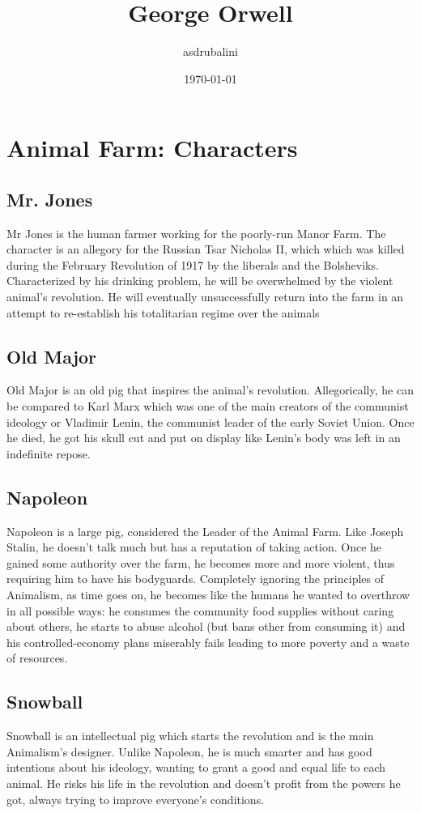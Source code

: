 \documentclass{article}
\title{George Orwell}
\author{asdrubalini}
\date{\today}
\begin{document}
    \maketitle

    \section{Animal Farm: Characters}

    \subsection{Mr. Jones}
    Mr Jones is the human farmer working for the poorly-run Manor Farm. The character is an allegory for the Russian Tsar Nicholas II, which which was killed during the February Revolution of 1917 by the liberals and the Bolsheviks. Characterized by his drinking problem, he will be overwhelmed by the violent animal's revolution. He will eventually unsuccessfully return into the farm in an attempt to re-establish his totalitarian regime over the animals

    \subsection{Old Major}
    Old Major is an old pig that inspires the animal's revolution. Allegorically, he can be compared to Karl Marx which was one of the main creators of the communist ideology or Vladimir Lenin, the communist leader of the early Soviet Union. Once he died, he got his skull cut and put on display like Lenin's body was left in an indefinite repose.

    \subsection{Napoleon}
    Napoleon is a large pig, considered the Leader of the Animal Farm. Like Joseph Stalin, he doesn't talk much but has a reputation of taking action. Once he gained some authority over the farm, he becomes more and more violent, thus requiring him to have his bodyguards.
    Completely ignoring the principles of Animalism, as time goes on, he becomes like the humans he wanted to overthrow in all possible ways: he consumes the community food supplies without caring about others, he starts to abuse alcohol (but bans other from consuming it) and his controlled-economy plans miserably fails leading to more poverty and a waste of resources.

    \subsection{Snowball}
    Snowball is an intellectual pig which starts the revolution and is the main Animalism's designer. Unlike Napoleon, he is much smarter and has good intentions about his ideology, wanting to grant a good and equal life to each animal. He risks his life in the revolution and doesn't profit from the powers he got, always trying to improve everyone's conditions.
\end{document}
